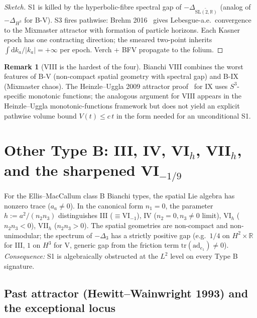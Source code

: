 \documentclass[11pt]{article}
\theoremstyle{definition}
\newtheorem{remark}[theorem]{Remark}
\newcommand{\R}{\mathbb{R}}
\begin{document}
\begin{proof}[Sketch]
S1 is killed by the hyperbolic-fibre spectral gap of $-\Delta_{\widetilde{\mathrm{SL}(2,\R)}}$ (analog of $-\Delta_{H^3}$ for B-V). S3 fires pathwise: Brehm 2016~\cite{Brehm2016} gives Lebesgue-a.e.\ convergence to the Mixmaster attractor with formation of particle horizons. Each Kasner epoch has one contracting direction; the smeared two-point inherits $\int\mathrm{d}k_a/|k_a|=+\infty$ per epoch. Verch + BFV propagate to the folium.
\end{proof}

\begin{remark}[VIII is the hardest of the four]\label{rem:BVIII-hard}
Bianchi VIII combines the worst features of B-V (non-compact spatial geometry with spectral gap) and B-IX (Mixmaster chaos). The Heinzle--Uggla 2009 attractor proof~\cite{HeinzleUgglaAttractor2009} for IX uses $S^3$-specific monotonic functions; the analogous argument for VIII appears in the Heinzle--Uggla monotonic-functions framework but does not yield an explicit pathwise volume bound $V(t)\le c\,t$ in the form needed for an unconditional S1.
\end{remark}

\section{\texorpdfstring{Other Type B: III, IV, VI$_h$, VII$_h$, and the sharpened VI$_{-1/9}$}{Other Type B: III, IV, VI\_h, VII\_h, and the sharpened VI\_\{-1/9\}}}\label{sec:typeB-other}

For the Ellis--MacCallum class B Bianchi types, the spatial Lie algebra has nonzero trace ($a_a\neq 0$). In the canonical form $n_1=0$, the parameter $h := a^2/(n_2 n_3)$ distinguishes III ($\equiv\mathrm{VI}_{-1}$), IV ($n_2=0,n_3\neq 0$ limit), VI$_h$ ($n_2 n_3<0$), VII$_h$ ($n_2 n_3>0$). The spatial geometries are non-compact and non-unimodular; the spectrum of $-\Delta_3$ has a strictly positive gap (e.g.\ $1/4$ on $H^2\times\R$ for III, $1$ on $H^3$ for V, generic gap from the friction term $\mathrm{tr}(\mathrm{ad}_{e_1})\neq 0$). \emph{Consequence:} S1 is algebraically obstructed at the $L^2$ level on every Type B signature.

\subsection{Past attractor (Hewitt--Wainwright 1993) and the exceptional locus}\label{sec:typeB-attractor}
\end{document}
